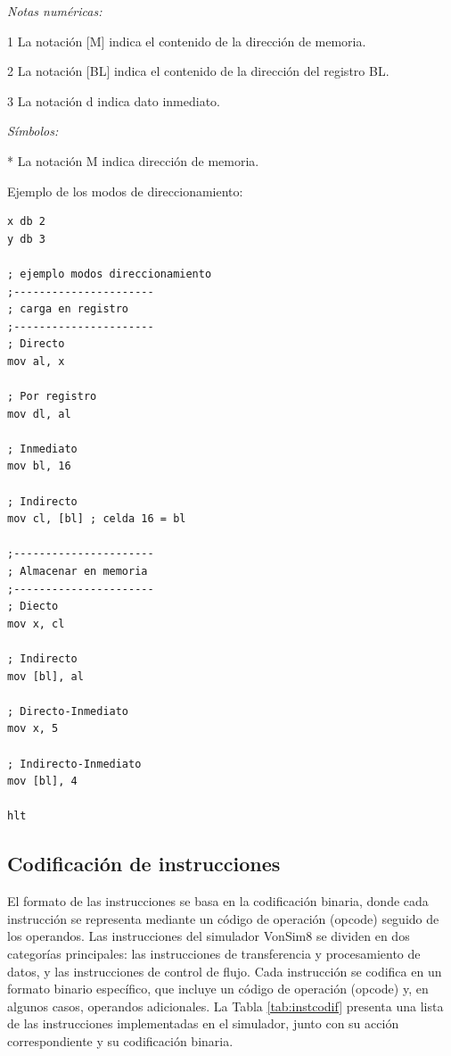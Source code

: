 \documentclass[12pt,oneside]{templates/unerthesis}
\begin{document}
\begin{table}[!h]
{\begin{threeparttable}
\begin{tablenotes}
\item \textit{Notas numéricas: } 
\item[1] La notación [M] indica el contenido de la dirección de memoria.
\item[2] La notación [BL] indica el contenido de la dirección del registro BL.
\item[3] La notación d indica dato inmediato.
\item \textit{Símbolos: } 
\item[*] La notación M indica dirección de memoria.
\end{tablenotes}
\end{threeparttable}}
\end{table}

Ejemplo de los modos de direccionamiento:

\begin{lstlisting}
x db 2 
y db 3

; ejemplo modos direccionamiento
;----------------------
; carga en registro
;----------------------
; Directo
mov al, x

; Por registro
mov dl, al

; Inmediato
mov bl, 16

; Indirecto
mov cl, [bl] ; celda 16 = bl

;----------------------
; Almacenar en memoria
;----------------------
; Diecto
mov x, cl

; Indirecto
mov [bl], al

; Directo-Inmediato
mov x, 5

; Indirecto-Inmediato
mov [bl], 4

hlt\end{lstlisting}

\hypertarget{codificaciuxf3n-de-instrucciones}{%
\subsection{Codificación de instrucciones}\label{codificaciuxf3n-de-instrucciones}}

El formato de las instrucciones se basa en la codificación binaria, donde cada instrucción se representa mediante un código de operación (opcode) seguido de los operandos. Las instrucciones del simulador VonSim8 se dividen en dos categorías principales: las instrucciones de transferencia y procesamiento de datos, y las instrucciones de control de flujo. Cada instrucción se codifica en un formato binario específico, que incluye un código de operación (opcode) y, en algunos casos, operandos adicionales. La Tabla \ref{tab:instcodif} presenta una lista de las instrucciones implementadas en el simulador, junto con su acción correspondiente y su codificación binaria.
\end{document}
